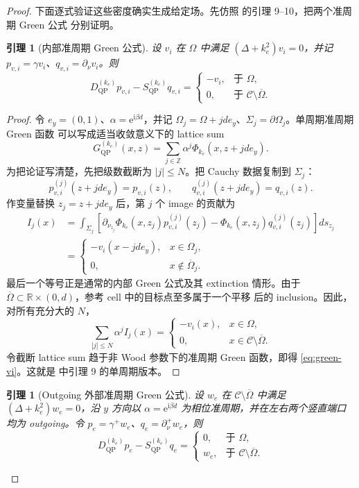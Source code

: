 \documentclass[UTF8,11pt,fontset=fandol]{ctexart}
\newcommand{\C}{\mathcal C}
\newcommand{\Om}{\Omega}
\newcommand{\Sig}{\Sigma}
\newcommand{\R}{\mathbb R}
\newcommand{\Z}{\mathbb Z}
\newcommand{\ii}{\mathrm i}
\newcommand{\ee}{\mathrm e}
\newcommand{\QP}{\mathrm{QP}}
\theoremstyle{plain}
\newtheorem{lemma}[theorem]{引理}
\theoremstyle{definition}
\theoremstyle{remark}
\begin{document}
\begin{proof}
下面逐式验证这些密度确实生成给定场。先仿照
\cite[附录 A]{BarnettGreengard2010} 的引理 9--10，把两个准周期 Green 公式
分别证明。

\begin{lemma}[内部准周期 Green 公式]
\label{lem:qp-green-interior}
设 \(v_i\) 在 \(\Om\) 中满足 \((\Delta+k_e^2)v_i=0\)，并记
\(p_{v,i}=\gamma v_i\)、\(q_{v,i}=\partial_\nu v_i\)。则
\begin{equation}
D_{\QP}^{(k_e)}p_{v,i}-S_{\QP}^{(k_e)}q_{v,i}
=\begin{cases}
-v_i,&\text{于 }\Om,\\
0,&\text{于 }\C\setminus\overline\Om.
\end{cases}
\label{eq:green-vi}
\end{equation}
\end{lemma}

\begin{proof}
令 \(e_y=(0,1)\)、\(\alpha=\ee^{\ii\beta d}\)，并记
\(\Om_j=\Om+jd e_y\)、\(\Sig_j=\partial\Om_j\)。单周期准周期 Green 函数
可以写成适当收敛意义下的 lattice sum
\[
G_{\QP}^{(k_e)}(x,z)
=\sum_{j\in\Z}\alpha^j\Phi_{k_e}(x,z+jd e_y).
\]
为把论证写清楚，先把级数截断为 \(|j|\leq N\)。把 Cauchy 数据复制到
\(\Sig_j\)：
\[
p_{v,i}^{(j)}(z+jd e_y)=p_{v,i}(z),\qquad
q_{v,i}^{(j)}(z+jd e_y)=q_{v,i}(z).
\]
作变量替换 \(z_j=z+jd e_y\) 后，第 \(j\) 个 image 的贡献为
\[
\begin{aligned}
I_j(x)
&=\int_{\Sig_j}
 \left[\partial_{\nu_{z_j}}\Phi_{k_e}(x,z_j)
             p_{v,i}^{(j)}(z_j)
       -\Phi_{k_e}(x,z_j)q_{v,i}^{(j)}(z_j)\right]ds_{z_j}\\
&=\begin{cases}
-v_i(x-jd e_y),&x\in\Om_j,\\
0,&x\notin\overline\Om_j.
\end{cases}
\end{aligned}
\]
最后一个等号正是通常的内部 Green 公式及其 extinction 情形。由于
\(\overline\Om\subset\R\times(0,d)\)，参考 cell 中的目标点至多属于一个平移
后的 inclusion。因此，对所有充分大的 \(N\)，
\[
\sum_{|j|\leq N}\alpha^j I_j(x)
=\begin{cases}-v_i(x),&x\in\Om,\\0,&x\in\C\setminus\overline\Om.
\end{cases}
\]
令截断 lattice sum 趋于非 Wood 参数下的准周期 Green 函数，即得
\eqref{eq:green-vi}。这就是
\cite[附录 A]{BarnettGreengard2010} 中引理 9 的单周期版本。
\end{proof}

\begin{lemma}[Outgoing 外部准周期 Green 公式]
\label{lem:qp-green-exterior}
设 \(w_e\) 在 \(\C\setminus\overline\Om\) 中满足
\((\Delta+k_e^2)w_e=0\)，沿 \(y\) 方向以
\(\alpha=\ee^{\ii\beta d}\) 为相位准周期，并在左右两个竖直端口均为
outgoing。令 \(p_e=\gamma^+w_e\)、\(q_e=\partial_\nu^+w_e\)，则
\begin{equation}
D_{\QP}^{(k_e)}p_e-S_{\QP}^{(k_e)}q_e
=\begin{cases}
0,&\text{于 }\Om,\\
w_e,&\text{于 }\C\setminus\overline\Om.
\end{cases}
\label{eq:green-we}
\end{equation}
\end{lemma}


\end{proof}
\end{document}
